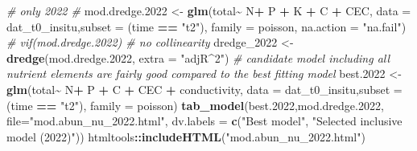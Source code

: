 \documentclass[
]{article}
\newenvironment{Shaded}{\begin{snugshade}}{\end{snugshade}}
\newcommand{\AttributeTok}[1]{\textcolor[rgb]{0.13,0.29,0.53}{#1}}
\newcommand{\CommentTok}[1]{\textcolor[rgb]{0.56,0.35,0.01}{\textit{#1}}}
\newcommand{\FloatTok}[1]{\textcolor[rgb]{0.00,0.00,0.81}{#1}}
\newcommand{\FunctionTok}[1]{\textcolor[rgb]{0.13,0.29,0.53}{\textbf{#1}}}
\newcommand{\NormalTok}[1]{#1}
\newcommand{\OtherTok}[1]{\textcolor[rgb]{0.56,0.35,0.01}{#1}}
\newcommand{\SpecialCharTok}[1]{\textcolor[rgb]{0.81,0.36,0.00}{\textbf{#1}}}
\newcommand{\StringTok}[1]{\textcolor[rgb]{0.31,0.60,0.02}{#1}}
\begin{document}
\begin{Shaded}
\begin{Highlighting}[]
\CommentTok{\# only 2022 \#}
\NormalTok{mod.dredge}\FloatTok{.2022} \OtherTok{\textless{}{-}} \FunctionTok{glm}\NormalTok{(total}\SpecialCharTok{\textasciitilde{}}\NormalTok{ N}\SpecialCharTok{+}\NormalTok{ P }\SpecialCharTok{+}\NormalTok{ K }\SpecialCharTok{+}\NormalTok{ C }\SpecialCharTok{+}\NormalTok{ CEC, }\AttributeTok{data =}\NormalTok{ dat\_t0\_insitu,}\AttributeTok{subset =}\NormalTok{ (time }\SpecialCharTok{==} \StringTok{"t2"}\NormalTok{), }\AttributeTok{family =}\NormalTok{ poisson, }\AttributeTok{na.action =} \StringTok{"na.fail"}\NormalTok{)}
\CommentTok{\# vif(mod.dredge.2022) \# no collinearity}
\NormalTok{dredge\_2022 }\OtherTok{\textless{}{-}} \FunctionTok{dredge}\NormalTok{(mod.dredge}\FloatTok{.2022}\NormalTok{, }\AttributeTok{extra =} \StringTok{"adjR\^{}2"}\NormalTok{) }\CommentTok{\# candidate model including all nutrient elements are fairly good compared to the best fitting model}
\NormalTok{best}\FloatTok{.2022} \OtherTok{\textless{}{-}} \FunctionTok{glm}\NormalTok{(total}\SpecialCharTok{\textasciitilde{}}\NormalTok{ N}\SpecialCharTok{+}\NormalTok{ P }\SpecialCharTok{+}\NormalTok{ C }\SpecialCharTok{+}\NormalTok{ CEC }\SpecialCharTok{+}\NormalTok{ conductivity, }\AttributeTok{data =}\NormalTok{ dat\_t0\_insitu,}\AttributeTok{subset =}\NormalTok{ (time }\SpecialCharTok{==} \StringTok{"t2"}\NormalTok{), }\AttributeTok{family =}\NormalTok{ poisson)}
\FunctionTok{tab\_model}\NormalTok{(best}\FloatTok{.2022}\NormalTok{,mod.dredge}\FloatTok{.2022}\NormalTok{, }\AttributeTok{file=}\StringTok{"mod.abun\_nu\_2022.html"}\NormalTok{, }\AttributeTok{dv.labels =} \FunctionTok{c}\NormalTok{(}\StringTok{"Best model"}\NormalTok{, }\StringTok{"Selected inclusive model (2022)"}\NormalTok{))}
\NormalTok{htmltools}\SpecialCharTok{::}\FunctionTok{includeHTML}\NormalTok{(}\StringTok{"mod.abun\_nu\_2022.html"}\NormalTok{)}


\end{Highlighting}
\end{Shaded}
\end{document}
